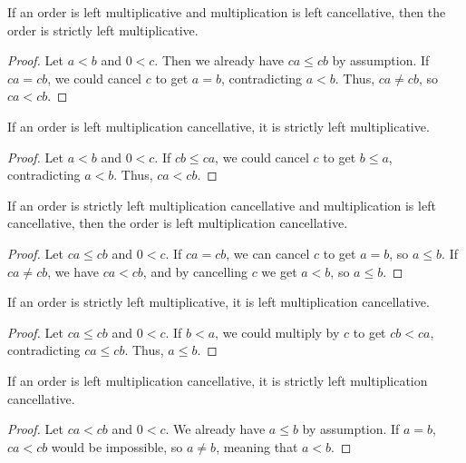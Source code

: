 \documentclass[../../math.tex]{subfiles}
\begin{document}
\begin{instance} \label{lt_lmult1}
    If an order is left multiplicative and multiplication is left cancellative,
    then the order is strictly left multiplicative.
\end{instance}
\begin{proof}
    Let $a < b$ and $0 < c$.  Then we already have $ca \leq cb$ by assumption.
    If $ca = cb$, we could cancel $c$ to get $a = b$, contradicting $a < b$.
    Thus, $ca \neq cb$, so $ca < cb$.
\end{proof}

\begin{instance} \label{lt_lmult2}
    If an order is left multiplication cancellative, it is strictly left
    multiplicative.
\end{instance}
\begin{proof}
    Let $a < b$ and $0 < c$.  If $cb \leq ca$, we could cancel $c$ to get $b
    \leq a$, contradicting $a < b$.  Thus, $ca < cb$.
\end{proof}

\begin{instance} \label{le_mult_lcancel1}
    If an order is strictly left multiplication cancellative and multiplication
    is left cancellative, then the order is left multiplication cancellative.
\end{instance}
\begin{proof}
    Let $ca \leq cb$ and $0 < c$.  If $ca = cb$, we can cancel $c$ to get $a =
    b$, so $a \leq b$.  If $ca \neq cb$, we have $ca < cb$, and by cancelling
    $c$ we get $a < b$, so $a \leq b$.
\end{proof}

\begin{instance} \label{le_mult_lcancel2}
    If an order is strictly left multiplicative, it is left multiplication
    cancellative.
\end{instance}
\begin{proof}
    Let $ca \leq cb$ and $0 < c$.  If $b < a$, we could multiply by $c$ to get
    $cb < ca$, contradicting $ca \leq cb$.  Thus, $a \leq b$.
\end{proof}

\begin{instance} \label{lt_mult_lcancel1}
    If an order is left multiplication cancellative, it is strictly left
    multiplication cancellative.
\end{instance}
\begin{proof}
    Let $ca < cb$ and $0 < c$.  We already have $a \leq b$ by assumption.  If
    $a = b$, $ca < cb$ would be impossible, so $a \neq b$, meaning that $a < b$.
\end{proof}
\end{document}
